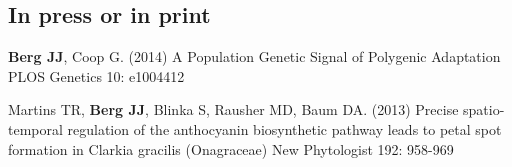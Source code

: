 \documentclass[letterpaper]{article}
\begin{document}
\subsection*{In press or in print}
\begin{etaremune}
\item {\bf Berg JJ}, Coop G. (2014)  A Population Genetic Signal of Polygenic Adaptation PLOS Genetics 10: e1004412
\item Martins TR,  {\bf Berg JJ}, Blinka S, Rausher MD, Baum DA. (2013)  Precise spatio-temporal regulation of the anthocyanin biosynthetic pathway leads to petal spot formation in Clarkia gracilis (Onagraceae) New Phytologist 192: 958-969


\end{etaremune}
\end{document}
